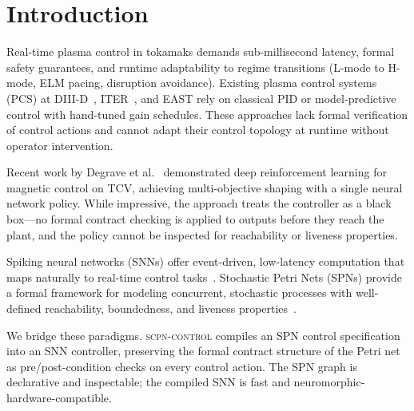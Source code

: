 \documentclass[twocolumn,preprintnumbers,amsmath,amssymb,prl,floatfix]{revtex4-2}
\begin{document}
\maketitle

\section{Introduction}
\label{sec:intro}

Real-time plasma control in tokamaks demands sub-millisecond latency,
formal safety guarantees, and runtime adaptability to regime transitions
(L-mode to H-mode, ELM pacing, disruption avoidance).
Existing plasma control systems (PCS) at DIII-D~\cite{ferron1998},
ITER~\cite{iter_codac,humphreys2015}, and EAST rely on classical PID or
model-predictive control with hand-tuned gain schedules.
These approaches lack formal verification of control actions and cannot
adapt their control topology at runtime without operator intervention.

Recent work by Degrave et al.~\cite{degrave2022} demonstrated deep
reinforcement learning for magnetic control on TCV, achieving multi-objective
shaping with a single neural network policy.  While impressive, the approach
treats the controller as a black box---no formal contract checking is
applied to outputs before they reach the plant, and the policy cannot be
inspected for reachability or liveness properties.

Spiking neural networks (SNNs) offer event-driven, low-latency
computation that maps naturally to real-time control
tasks~\cite{tavanaei2019,maass1997}.  Stochastic Petri Nets (SPNs)
provide a formal framework for modeling concurrent, stochastic processes
with well-defined reachability, boundedness, and liveness
properties~\cite{marsan1995,murata1989}.

We bridge these paradigms.  \textsc{scpn-control} compiles an SPN
control specification into an SNN controller, preserving the formal
contract structure of the Petri net as pre/post-condition checks on
every control action.  The SPN graph is declarative and inspectable;
the compiled SNN is fast and neuromorphic-hardware-compatible.
\end{document}
